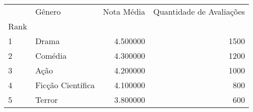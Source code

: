 \begin{tabular}{llrr}
 & Gênero & Nota Média & Quantidade de Avaliações \\
Rank &  &  &  \\
1 & Drama & 4.500000 & 1500 \\
2 & Comédia & 4.300000 & 1200 \\
3 & Ação & 4.200000 & 1000 \\
4 & Ficção Científica & 4.100000 & 800 \\
5 & Terror & 3.800000 & 600 \\
\end{tabular}
